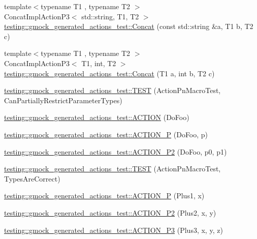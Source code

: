 \begin{DoxyCompactItemize}
\item 
{\footnotesize template$<$typename T1 , typename T2 $>$ }\\Concat\+Impl\+Action\+P3$<$ std\+::string, T1, T2 $>$ \hyperlink{namespacetesting_1_1gmock__generated__actions__test_a28213583d5450876b564a3df58d1cf91}{testing\+::gmock\+\_\+generated\+\_\+actions\+\_\+test\+::\+Concat} (const std\+::string \&a, T1 b, T2 c)
\item 
{\footnotesize template$<$typename T1 , typename T2 $>$ }\\Concat\+Impl\+Action\+P3$<$ T1, int, T2 $>$ \hyperlink{namespacetesting_1_1gmock__generated__actions__test_a861e9fadbecf0c66e8226021c6c22013}{testing\+::gmock\+\_\+generated\+\_\+actions\+\_\+test\+::\+Concat} (T1 a, int b, T2 c)
\item 
\hyperlink{namespacetesting_1_1gmock__generated__actions__test_a7222610b197216e7976b3fa751f97daf}{testing\+::gmock\+\_\+generated\+\_\+actions\+\_\+test\+::\+T\+E\+ST} (Action\+Pn\+Macro\+Test, Can\+Partially\+Restrict\+Parameter\+Types)
\item 
\hyperlink{namespacetesting_1_1gmock__generated__actions__test_a183b3863b3c2319ac414fe694455f58c}{testing\+::gmock\+\_\+generated\+\_\+actions\+\_\+test\+::\+A\+C\+T\+I\+ON} (Do\+Foo)
\item 
\hyperlink{namespacetesting_1_1gmock__generated__actions__test_a8487a3396f4f705e134e44584634ef1c}{testing\+::gmock\+\_\+generated\+\_\+actions\+\_\+test\+::\+A\+C\+T\+I\+O\+N\+\_\+P} (Do\+Foo, p)
\item 
\hyperlink{namespacetesting_1_1gmock__generated__actions__test_acd38e742235e154ad309f22e9a470a86}{testing\+::gmock\+\_\+generated\+\_\+actions\+\_\+test\+::\+A\+C\+T\+I\+O\+N\+\_\+\+P2} (Do\+Foo, p0, p1)
\item 
\hyperlink{namespacetesting_1_1gmock__generated__actions__test_ad702feced8b71b3708782b1a2274453e}{testing\+::gmock\+\_\+generated\+\_\+actions\+\_\+test\+::\+T\+E\+ST} (Action\+Pn\+Macro\+Test, Types\+Are\+Correct)
\item 
\hyperlink{namespacetesting_1_1gmock__generated__actions__test_a89c01b82e854ad79e3d139aa72477747}{testing\+::gmock\+\_\+generated\+\_\+actions\+\_\+test\+::\+A\+C\+T\+I\+O\+N\+\_\+P} (Plus1, x)
\item 
\hyperlink{namespacetesting_1_1gmock__generated__actions__test_a0e2768c0fae30bc46ec6e322b29dd54c}{testing\+::gmock\+\_\+generated\+\_\+actions\+\_\+test\+::\+A\+C\+T\+I\+O\+N\+\_\+\+P2} (Plus2, x, y)
\item 
\hyperlink{namespacetesting_1_1gmock__generated__actions__test_afc911947c840aa9857eb2d06e4d80787}{testing\+::gmock\+\_\+generated\+\_\+actions\+\_\+test\+::\+A\+C\+T\+I\+O\+N\+\_\+\+P3} (Plus3, x, y, z)

\end{DoxyCompactItemize}
